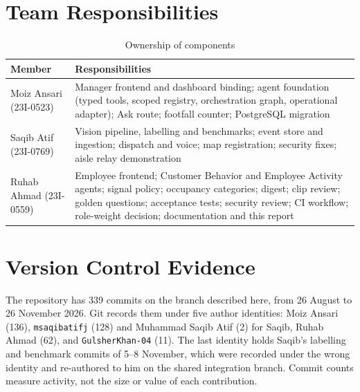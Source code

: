 \section{Team Responsibilities}
\begin{table}[H]
\centering
\caption{Ownership of components}\label{tab:ownership}
\begin{tabular}{P{0.2\textwidth}P{0.72\textwidth}}
\toprule
Member & Responsibilities\\
\midrule
Moiz Ansari (23I-0523) & Manager frontend and dashboard binding; agent foundation (typed tools, scoped registry, orchestration graph, operational adapter); Ask route; footfall counter; PostgreSQL migration\\
Saqib Atif (23I-0769) & Vision pipeline, labelling and benchmarks; event store and ingestion; dispatch and voice; map registration; security fixes; aisle relay demonstration\\
Ruhab Ahmad (23I-0559) & Employee frontend; Customer Behavior and Employee Activity agents; signal policy; occupancy categories; digest; clip review; golden questions; acceptance tests; security review; CI workflow; role-weight decision; documentation and this report\\
\bottomrule
\end{tabular}
\end{table}

\section{Version Control Evidence}
The repository  has 339 commits on the branch described here, from 26 August to 26 November 2026. Git records them under five author identities: Moiz Ansari (136), \texttt{msaqibatifj} (128) and Muhammad Saqib Atif (2) for Saqib, Ruhab Ahmad (62), and \texttt{GulsherKhan-04} (11). The last identity holds Saqib's labelling and benchmark commits of 5--8 November, which were recorded under the wrong identity and re-authored to him on the shared integration branch. Commit counts measure activity, not the size or value of each contribution.

